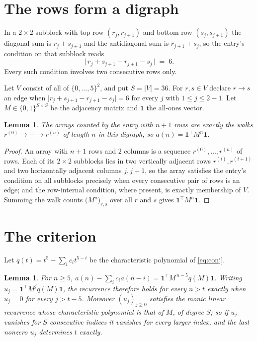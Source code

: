 \documentclass[11pt,a4paper]{article}
\theoremstyle{plain}
\newtheorem{lemma}[theorem]{Lemma}
\theoremstyle{definition}
\begin{document}
\section{The rows form a digraph}

In a $2\times2$ subblock with top row $(r_j,r_{j+1})$ and bottom row $(s_j,s_{j+1})$ the
diagonal sum is $r_j+s_{j+1}$ and the antidiagonal sum is $r_{j+1}+s_j$, so the entry's
condition on that subblock reads
\[
\bigl|\,r_j+s_{j+1}-r_{j+1}-s_j\,\bigr|\;=\;6.
\]
Every such condition involves two consecutive rows only.

Let $V$ consist of all of $\{0,\dots,5\}^{2}$, and put $S=|V|=36$. For $r,s\in V$ declare $r\to s$ an edge
when $\bigl|r_j+s_{j+1}-r_{j+1}-s_j\bigr|=6$ for every $j$ with
$1\le j\le2-1$. Let $M\in\{0,1\}^{S\times S}$ be the adjacency matrix and $\mathbf{1}$
the all-ones vector.

\begin{lemma}\label{lem:walk}
The arrays counted by the entry with $n+1$ rows are exactly the walks
$r^{(0)}\to\cdots\to r^{(n)}$ of length $n$ in this digraph, so
$a(n)=\mathbf{1}^{\!\top}M^{n}\mathbf{1}$.
\end{lemma}

\begin{proof}
An array with $n+1$ rows and $2$ columns is a sequence $r^{(0)},\dots,r^{(n)}$ of
rows. Each of its $2\times2$ subblocks lies in two vertically adjacent rows
$r^{(i)},r^{(i+1)}$ and two horizontally adjacent columns $j,j+1$, so the array satisfies
the entry's condition on all subblocks precisely when every consecutive pair of rows is an
edge; and the row-internal condition, where present, is exactly membership of $V$. Summing
the walk counts $\bigl(M^{n}\bigr)_{r,s}$ over all $r$ and $s$ gives
$\mathbf{1}^{\!\top}M^{n}\mathbf{1}$.
\end{proof}

\section{The criterion}

Let $q(t)=t^{5}-\sum_i c_i t^{5-i}$ be the characteristic polynomial of
\eqref{eq:conj}.

\begin{lemma}\label{lem:crit}
For $n\ge5$,
$a(n)-\sum_i c_i a(n-i)=\mathbf{1}^{\!\top}M^{\,n-5}q(M)\mathbf{1}$. Writing
$u_j=\mathbf{1}^{\!\top}M^{j}q(M)\mathbf{1}$, the recurrence therefore holds for every
$n>t$ exactly when $u_j=0$ for every $j>t-5$. Moreover $(u_j)_{j\ge0}$ satisfies the
monic linear recurrence whose characteristic polynomial is that of $M$, of degree $S$; so
if $u_j$ vanishes for $S$ consecutive indices it vanishes for every larger index, and the
last nonzero $u_j$ determines $t$ exactly.
\end{lemma}
\end{document}
